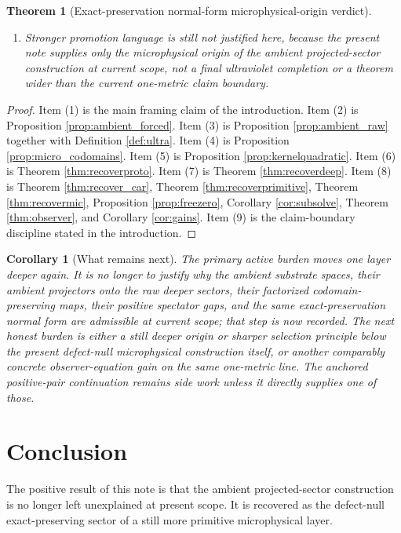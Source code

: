 \documentclass[11pt]{article}
\newtheorem{corollary}{Corollary}
\newtheorem{theorem}{Theorem}
\begin{document}
\begin{theorem}[Exact-preservation normal-form microphysical-origin verdict]
\begin{enumerate}
    \item Stronger promotion language is still not justified here, because the present note supplies only the microphysical origin of the ambient projected-sector construction at current scope, not a final ultraviolet completion or a theorem wider than the current one-metric claim boundary.
\end{enumerate}
\end{theorem}

\begin{proof}
Item (1) is the main framing claim of the introduction. Item (2) is Proposition \ref{prop:ambient_forced}. Item (3) is Proposition \ref{prop:ambient_raw} together with Definition \ref{def:ultra}. Item (4) is Proposition \ref{prop:micro_codomains}. Item (5) is Proposition \ref{prop:kernelquadratic}. Item (6) is Theorem \ref{thm:recoverproto}. Item (7) is Theorem \ref{thm:recoverdeep}. Item (8) is Theorem \ref{thm:recover_car}, Theorem \ref{thm:recoverprimitive}, Theorem \ref{thm:recovermic}, Proposition \ref{prop:freezero}, Corollary \ref{cor:subsolve}, Theorem \ref{thm:observer}, and Corollary \ref{cor:gains}. Item (9) is the claim-boundary discipline stated in the introduction.
\end{proof}

\begin{corollary}[What remains next]
The primary active burden moves one layer deeper again. It is no longer to justify why the ambient substrate spaces, their ambient projectors onto the raw deeper sectors, their factorized codomain-preserving maps, their positive spectator gaps, and the same exact-preservation normal form are admissible at current scope; that step is now recorded. The next honest burden is either a still deeper origin or sharper selection principle below the present defect-null microphysical construction itself, or another comparably concrete observer-equation gain on the same one-metric line. The anchored positive-pair continuation remains side work unless it directly supplies one of those.
\end{corollary}

\section{Conclusion}

The positive result of this note is that the ambient projected-sector construction is no longer left unexplained at present scope. It is recovered as the defect-null exact-preserving sector of a still more primitive microphysical layer.
\end{document}

